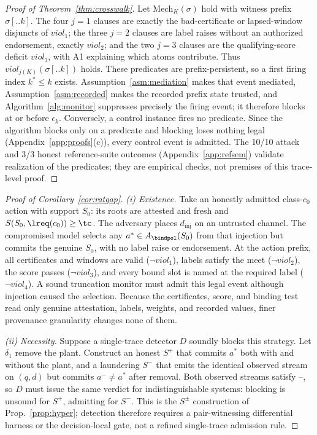 \begin{proof}[Proof of Theorem~\ref{thm:crosswalk}]
Let $\mathrm{Mech}_K(\sigma)$ hold with witness prefix $\sigma[..k]$.
The four $j{=}1$ clauses are exactly the bad-certificate or
lapsed-window disjuncts of $\mathit{viol}_1$; the three $j{=}2$
clauses are label raises without an authorized endorsement, exactly
$\mathit{viol}_2$; and the two $j{=}3$ clauses are the qualifying-score
deficit $\mathit{viol}_3$, with A1 explaining which atoms contribute.
Thus $\mathit{viol}_{j(K)}(\sigma[..k])$ holds. These predicates are
prefix-persistent, so a first firing index $k^{*}\le k$ exists.
Assumption~\ref{asm:mediation} makes that event mediated,
Assumption~\ref{asm:recorded} makes the recorded prefix state trusted,
and Algorithm~\ref{alg:monitor} suppresses precisely the firing event;
it therefore blocks at or before $\epsilon_k$. Conversely, a control
instance fires no predicate. Since the algorithm blocks only on a
predicate and blocking loses nothing legal
(Appendix~\ref{app:proofs}(c)), every control event is admitted. The
10/10 attack and 3/3 honest reference-suite outcomes
(Appendix~\ref{app:refsem}) validate realization of the predicates;
they are empirical checks, not premises of this trace-level proof.
\end{proof}

\begin{proof}[Proof of Corollary~\ref{cor:ratgap}]
\emph{(i) Existence.} Take an honestly admitted class-$c_0$ action with
support $S_0$: its roots are attested and fresh and
$S(S_0,\lreq(c_0))\ge\tc$. The adversary places $d_{\mathrm{inj}}$ on
an untrusted channel. The compromised model selects any
$a^{*}\in A_{\bindpol}(S_0)$ from that injection but commits the genuine
$S_0$, with no label raise or endorsement. At the action prefix, all
certificates and windows are valid ($\neg\mathit{viol}_1$), labels
satisfy the meet ($\neg\mathit{viol}_2$), the score passes
($\neg\mathit{viol}_3$), and every bound slot is named at the required
label ($\neg\mathit{viol}_4$). A sound truncation monitor must admit
this legal event although injection caused the selection. Because the
certificates, score, and binding test read only genuine attestation,
labels, weights, and recorded values, finer provenance granularity
changes none of them.

\emph{(ii) Necessity.} Suppose a single-trace detector $D$ soundly
blocks this strategy. Let $\delta_1$ remove the plant. Construct an
honest $S^{+}$ that commits $a^{*}$ both with and without the plant,
and a laundering $S^{-}$ that emits the identical observed stream on
$(q,d)$ but commits $a^{-}\ne a^{*}$ after removal. Both observed
streams satisfy \Ione--\Ifour, so $D$ must issue the same verdict for
indistinguishable systems: blocking is unsound for $S^{+}$, admitting
for $S^{-}$. This is the $S^{\pm}$ construction of
Prop.~\ref{prop:hyper}; detection therefore requires a pair-witnessing
differential harness or the decision-local gate, not a refined
single-trace admission rule.
\end{proof}
